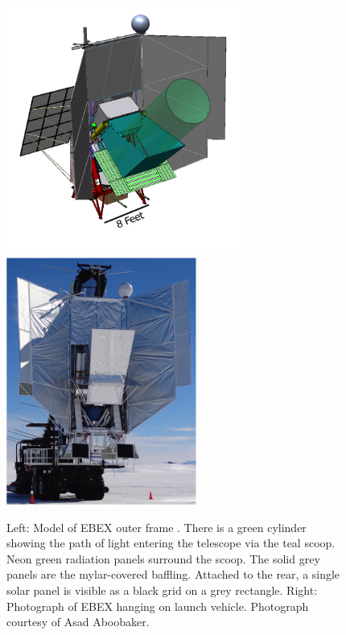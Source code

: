 \begin{figure}[htbp]
\begin{center}
\includegraphics[height=3.2in]{figures/ebex_model.png}
\includegraphics[height=3.2in]{figures/ebex_hanging.png}
\caption[Outer frame, model and photograph]{Left: Model of \ac{EBEX} outer frame \cite{Zilic2014}. There is a green cylinder showing the path of light entering the telescope via the teal scoop. Neon green radiation panels surround the scoop. The solid grey panels are the mylar-covered baffling. Attached to the rear, a single solar panel is visible as a black grid on a grey rectangle. Right: Photograph of \ac{EBEX} hanging on launch vehicle. Photograph courtesy of Asad Aboobaker. 
\label{fig:outer_frame} }
\end{center}
\end{figure}

